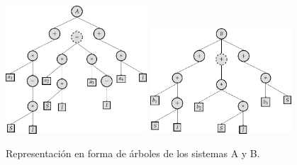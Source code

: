\begin{center}




    \begin{figure}[H]
        \centering
        \includegraphics[width=0.47\textwidth]{"figures/cross_example_1.pdf"}
        \qquad
        \includegraphics[width=0.47\textwidth]{"figures/cross_example_2.pdf"}
        \caption{Representación en forma de árboles de los sistemas A y B.}
        \label{tikzpicture:cross_example_1}
    \end{figure}
\end{center}

